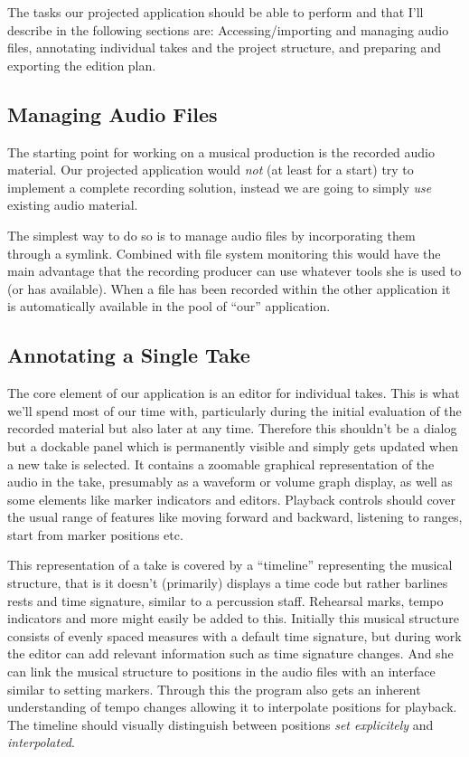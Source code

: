 \documentclass[11pt,a4paper]{article}
\begin{document}
The tasks our projected application should be able to perform and that I'll describe in the following sections are:
Accessing/importing and managing audio files,
annotating individual takes and the project structure, and
preparing and exporting the edition plan.

\subsection{Managing Audio Files}

The starting point for working on a musical production is the recorded audio material.
Our projected application would \emph{not} (at least for a start) try to implement a complete recording solution, instead we are going to simply \emph{use} existing audio material.

The simplest way to do so is to manage audio files by incorporating them through a symlink.
Combined with file system monitoring this would have the main advantage that the recording producer can use whatever tools she is used to (or has available).
When a file has been recorded within the other application it is automatically available in the pool of “our” application.


\subsection{Annotating a Single Take}
The core element of our application is an editor for individual takes.
This is what we'll spend most of our time with, particularly during the initial evaluation of the recorded material but also later at any time.
Therefore this shouldn't be a dialog but a dockable panel which is permanently visible and simply gets updated when a new take is selected.
It contains a zoomable graphical representation of the audio in the take, presumably as a waveform or volume graph display, as well as some elements like marker indicators and editors.
Playback controls should cover the usual range of features like moving forward and backward, listening to ranges, start from marker positions etc.

This representation of a take is covered by a “timeline” representing the musical structure, that is it doesn't (primarily) displays a time code but rather barlines rests and time signature, similar to a percussion staff.
Rehearsal marks, tempo indicators and more might easily be added to this.
Initially this musical structure consists of evenly spaced measures with a default time signature, but during work the editor can add relevant information such as time signature changes.
And she can link the musical structure to positions in the audio files with an interface similar to setting markers.
Through this the program also gets an inherent understanding of tempo changes allowing it to interpolate positions for playback.
The timeline should visually distinguish between positions \emph{set explicitely} and \emph{interpolated}.
\end{document}
